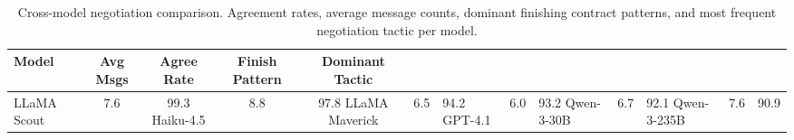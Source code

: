 \begin{table}[t]
\centering
\caption{Cross-model negotiation comparison. Agreement rates, average message counts, dominant finishing contract patterns, and most frequent negotiation tactic per model.}
\label{tab:cross_model_negotiation}
\small
\begin{tabular}{lcccc}
\toprule
Model & Avg Msgs & Agree Rate & Finish Pattern & Dominant Tactic \\
\midrule
  LLaMA Scout & 7.6 & 99.3%
  Haiku-4.5 & 8.8 & 97.8%
  LLaMA Maverick & 6.5 & 94.2%
  GPT-4.1 & 6.0 & 93.2%
  Qwen-3-30B & 6.7 & 92.1%
  Qwen-3-235B & 7.6 & 90.9%
\bottomrule
\end{tabular}
\end{table}
